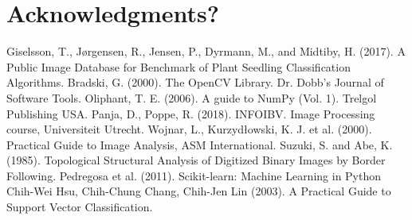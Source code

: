 \documentclass[runningheads]{llncs}
\begin{document}
\section{Acknowledgments?}
%
%
% 
% 
%
\begin{thebibliography}{}
	 Giselsson, T., Jørgensen, R., Jensen, P., Dyrmann, M., and Midtiby, H. (2017). A Public Image Database for Benchmark of Plant Seedling Classification Algorithms.
	 Bradski, G. (2000). The OpenCV Library. Dr. Dobb's Journal of Software Tools.
	 Oliphant, T. E. (2006). A guide to NumPy (Vol. 1). Trelgol Publishing USA.
	 Panja, D., Poppe, R. (2018). INFOIBV. Image Processing course, Universiteit Utrecht.
	 Wojnar, L., Kurzydłowski, K. J. et al. (2000). Practical Guide to Image Analysis, ASM International.
	 Suzuki, S. and Abe, K. (1985). Topological Structural Analysis of Digitized Binary Images by Border Following.
	 Pedregosa et al. (2011). Scikit-learn: Machine Learning in Python
	 Chih-Wei Hsu, Chih-Chung Chang, Chih-Jen Lin (2003). A Practical Guide to Support Vector Classification.
\end{thebibliography}
\end{document}
